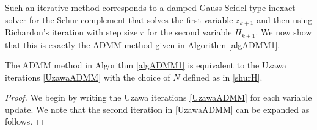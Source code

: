 Such an iterative method corresponds to a damped Gauss-Seidel type inexact solver for the Schur complement that solves the first variable $z_{k+1}$ and then using Richardon's iteration with step size $r$ for the second variable $H_{k+1}$. We now show that this is exactly the ADMM method given in Algorithm \ref{algADMM1}.

\begin{proposition}\label{prop: Uzawa iterative solver}
The ADMM method in Algorithm \ref{algADMM1} is equivalent to the Uzawa iterations \eqref{UzawaADMM} with the choice of $N$ defined as in \eqref{shurH}.
\end{proposition}
\begin{proof}
We begin by writing the Uzawa iterations \eqref{UzawaADMM} for each variable update. We note that the second iteration in \eqref{UzawaADMM}  can be expanded as follows.


\end{proof}
